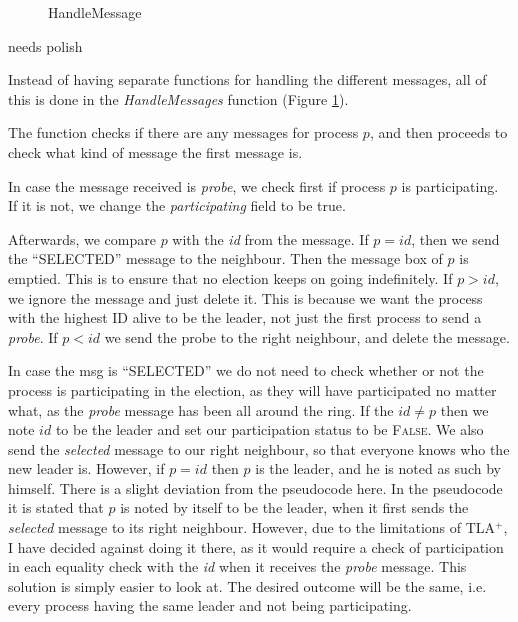\documentclass{report}
\begin{document}
\begin{calloutgreen}
\begin{calloutyellow}
\begin{figure}
\@x{}\bottombar\@xx{}%

  \caption{HandleMessage}
  \label{ringhandlemessages}
  \end{figure}

  \begin{calloutyellow}
    needs polish
    \end{calloutyellow}

Instead of having separate functions for handling the different messages, all of this is done in the \textit{HandleMessages} function (Figure \ref{ringhandlemessages}).

The function checks if there are any messages for process $p$, and then proceeds to check what kind of message the first message is.

In case the message received is \textit{probe}, we check first if process $p$ is participating. If it is not, we change the \textit{participating} field to be true.

Afterwards, we compare $p$ with the \textit{id} from the message.
If $p = id$, then we send the ``SELECTED'' message to the neighbour. Then the message box of $p$ is emptied. This is to ensure that no election keeps on going indefinitely.
If $p > id$, we ignore the message and just delete it. This is because we want the process with the highest ID alive to be the leader, not just the first process to send a \textit{probe}.
If $p < id$ we send the probe to the right  neighbour, and delete the message.


In case the msg is ``SELECTED'' we do not need to check whether or not the process is participating in the election, as they will have participated no matter what, as the \textit{probe} message has been all around the ring. If the $id \neq p$ then we note $id$ to be the leader and set our participation status to be \textsc{False}. We also send the \textit{selected} message to our right neighbour, so that everyone knows who the new leader is. However, if $p = id$ then $p$ is the leader, and he is noted as such by himself. There is a slight deviation from the pseudocode here. In the pseudocode it is stated that $p$ is noted by itself to be the leader, when it first sends the \textit{selected} message to its right neighbour. However, due to the limitations of TLA$^{+}$, I have decided against doing it there, as it would require a check of participation in each equality check with the \textit{id} when it receives the \textit{probe} message. This solution is simply easier to look at. The desired outcome will be the same, i.e. every process having the same leader and not being participating.



\end{calloutyellow}
\end{calloutgreen}
\end{document}
